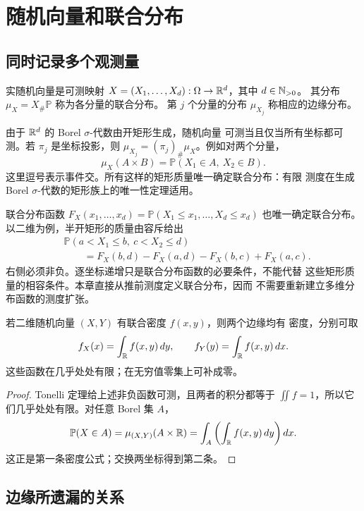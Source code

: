 \section{随机向量和联合分布}
\label{sec:random-vectors-joint-laws}

\subsection{同时记录多个观测量}

\begin{definition}\label{def:random-vector-joint-law}
实随机向量是可测映射
\(X=(X_1,\ldots,X_d):\Omega\to\mathbb{R}^d\)，其中 \(d\in\mathbb{N}_{>0}\)。
其分布 \(\mu_X=X_\#\mathbb P\) 称为各分量的联合分布。
第 \(j\) 个分量的分布 \(\mu_{X_j}\) 称相应的边缘分布。
\end{definition}

由于 \(\mathbb{R}^d\) 的 Borel \(\sigma\)-代数由开矩形生成，随机向量
可测当且仅当所有坐标都可测。若 \(\pi_j\) 是坐标投影，则
\(\mu_{X_j}=(\pi_j)_\#\mu_X\)。例如对两个分量，
\[
 \mu_X(A\times B)=\mathbb P(X_1\in A,\ X_2\in B).
\]
这里逗号表示事件交。所有这样的矩形质量唯一确定联合分布：有限
测度在生成 Borel \(\sigma\)-代数的矩形族上的唯一性定理适用。

联合分布函数
\(F_X(x_1,\ldots,x_d)=\mathbb P(X_1\le x_1,\ldots,X_d\le x_d)\)
也唯一确定联合分布。以二维为例，半开矩形的质量由容斥给出
\[
 \begin{aligned}
 &\mathbb P(a<X_1\le b,\ c<X_2\le d)\\
 &\qquad=F_X(b,d)-F_X(a,d)-F_X(b,c)+F_X(a,c).
 \end{aligned}
\]
右侧必须非负。逐坐标递增只是联合分布函数的必要条件，不能代替
这些矩形质量的相容条件。本章直接从推前测度定义联合分布，因而
不需要重新建立多维分布函数的测度扩张。

\begin{proposition}\label{prop:joint-density-marginals}
若二维随机向量 \((X,Y)\) 有联合密度 \(f(x,y)\)，则两个边缘均有
密度，分别可取
\[
 f_X(x)=\int_{\mathbb{R}} f(x,y)\,dy,\qquad
 f_Y(y)=\int_{\mathbb{R}} f(x,y)\,dx.
\]
这些函数在几乎处处有限；在无穷值零集上可补成零。
\end{proposition}
\begin{proof}
Tonelli 定理给上述非负函数可测，且两者的积分都等于
\(\iint f=1\)，所以它们几乎处处有限。对任意 Borel 集 \(A\)，
\[
 \mathbb P(X\in A)=\mu_{(X,Y)}(A\times\mathbb{R})
 =\int_A\left(\int_{\mathbb{R}} f(x,y)\,dy\right)dx.
\]
这正是第一条密度公式；交换两坐标得到第二条。
\end{proof}

\subsection{边缘所遗漏的关系}

